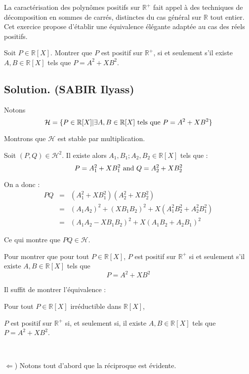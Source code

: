 La caract{\'e}risation des polyn{\^o}mes positifs sur $\mathbb{R}^+$ fait
appel {\`a} des techniques de d{\'e}composition en sommes de carr{\'e}s,
distinctes du cas g{\'e}n{\'e}ral sur \ensuremath{\mathbb{R}} tout entier. Cet
exercice propose d'{\'e}tablir une {\'e}quivalence {\'e}l{\'e}gante
adapt{\'e}e au cas des r{\'e}els positifs.
\begin{exercise}[(Oral de l'X 2016)]
Soit $P \in \mathbb{R}[X]$. Montrer que $P$ est positif sur $\mathbb{R}^+$, si
et seulement s'il existe $A, B \in \mathbb{R}[X]$ tels que $P = A^2 + XB^2$.
\end{exercise}

\subsection*{Solution. (SABIR Ilyass)}

Notons
\[ \mathcal{H}=\{P \in \mathbb{R}[X] |  \exists A, B \in
   \mathbb{R}[X] \text{ tels que } P = A^2 + XB^2 \} \]


Montrons que $\mathcal{H}$ est stable par multiplication.

Soit $(P, Q) \in \mathcal{H}^2$. Il existe alors $A_1, B_1 ; A_2, B_2 \in
\mathbb{R}[X]$ tels que :
\[ P = A_1^2 + XB_1^2 \text{ and } Q = A_2^2 + XB_2^2 \]


On a donc :
\begin{eqnarray*}
  PQ & = & (A_1^2 + XB_1^2) (A_2^2 + XB_2^2)\\
  & = & (A_1 A_2)^2 + (XB_1 B_2)^2 + X (A_1^2 B_2^2 + A_2^2 B_1^2)\\
  & = & (A_1 A_2 - XB_1 B_2)^2 + X (A_1 B_2 + A_2 B_1)^2
\end{eqnarray*}


Ce qui montre que $PQ \in \mathcal{H}$.

Pour montrer que pour tout $P \in \mathbb{R}[X]$, $P$ est positif sur
$\mathbb{R}^+$ si et seulement s'il existe $A, B \in \mathbb{R}[X]$ tels que
\[ P = A^2 + XB^2 \]


Il suffit de montrer l'{\'e}quivalence :

Pour tout $P \in \mathbb{R}[X]$ irr{\'e}ductible dans $\mathbb{R}[X]$,

$P$ est positif sur $\mathbb{R}^+$ si, et seulement si, il existe $A, B \in
\mathbb{R}[X]$ tels que $P = A^2 + XB^2$.

\

$\Leftarrow$) Notons tout d'abord que la r{\'e}ciproque est {\'e}vidente.

